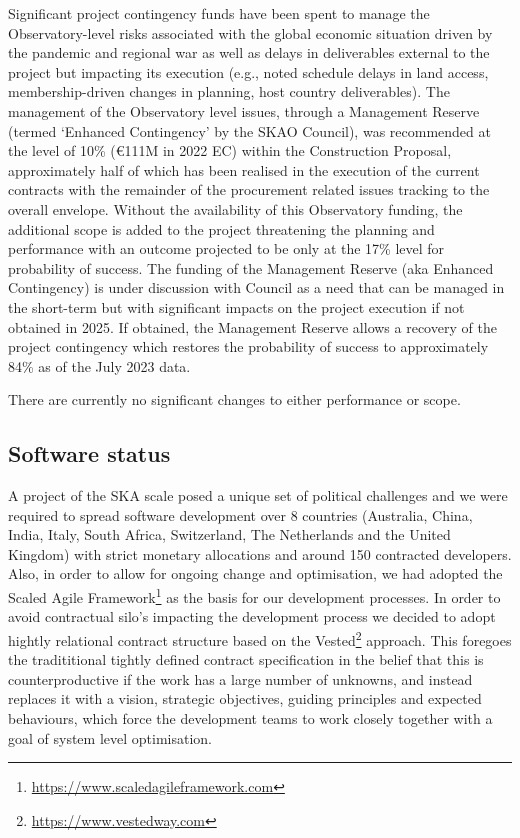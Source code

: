 \documentclass[a4paper,
               biblatex,     %
               keeplastbox,   %
               ]{jacow}
\begin{document}
Significant project contingency funds have been spent to manage the Observatory-level risks associated with the global economic situation driven by the pandemic and regional war as well as delays in deliverables external to the project but impacting its execution (e.g., noted schedule delays in land access, membership-driven changes in planning, host country deliverables). The management of the Observatory level issues, through a Management Reserve (termed ‘Enhanced Contingency’ by the SKAO Council), was recommended at the level of 10\% (€111M in 2022 EC) within the Construction Proposal, approximately half of which has been realised in the execution of the current contracts with the remainder of the procurement related issues tracking to the overall envelope. Without the availability of this Observatory funding, the additional scope is added to the project threatening the planning and performance with an outcome projected to be only at the 17\% level for probability of success. The funding of the Management Reserve (aka Enhanced Contingency) is under discussion with Council as a need that can be managed in the short-term but with significant impacts on the project execution if not obtained in 2025. If obtained, the Management Reserve allows a recovery of the project contingency which restores the probability of success to approximately 84\% as of the July 2023 data.

There are currently no significant changes to either performance or scope.

\subsection{Software status}
A project of the SKA scale posed a unique set of political challenges and we were required to spread software development over 8 countries (Australia, China, India, Italy, South Africa, Switzerland, The Netherlands and the United Kingdom) with strict monetary allocations and around 150 contracted developers. Also, in order to allow for ongoing change and optimisation, we had adopted the Scaled Agile Framework\footnote{\url{https://www.scaledagileframework.com}} as the basis for our development processes. In order to avoid contractual silo's impacting the development process we decided to adopt hightly relational contract structure based on the Vested\footnote{\url{https://www.vestedway.com}} approach. This foregoes the tradititional tightly defined contract specification in the belief that this is counterproductive if the work has a large number of unknowns, and instead replaces it with a vision, strategic objectives, guiding principles and expected behaviours, which force the development teams to work closely together with a goal of system level optimisation.
\end{document}
